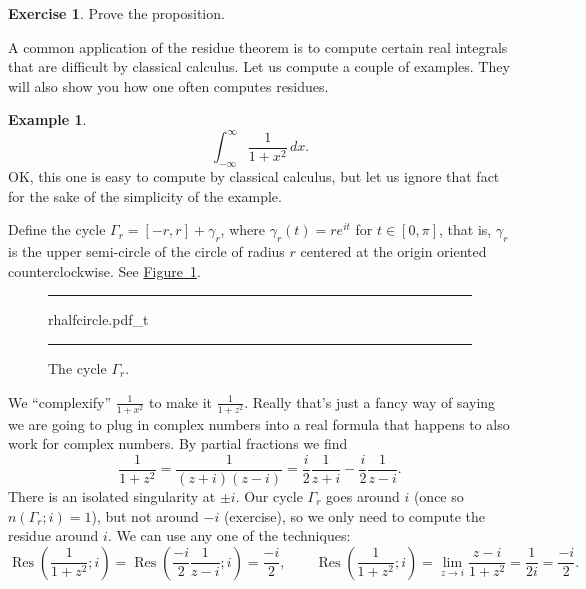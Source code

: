 \documentclass[12pt,openany]{book}
\theoremstyle{plain}
\theoremstyle{remark}
\theoremstyle{definition}
\newenvironment{exbox}{%
    \def\FrameCommand{\vrule width 1pt \relax\hspace {10pt}}%
    \MakeFramed {\advance \hsize -\width \FrameRestore }%
}{%
    \endMakeFramed
}
\newenvironment{myfig}{%
\begin{figure}[h!t]
\noindent\rule{\textwidth}{0.4pt}\vspace{12pt}\par\centering}%
{\par\noindent\rule{\textwidth}{0.4pt}
\end{figure}}
\theoremstyle{exercise}
\newtheorem{exercise}{Exercise}[section]
\theoremstyle{example}
\newtheorem{example}[thm]{Example}
\newcommand{\figureref}[1]{\hyperref[#1]{Figure~\ref*{#1}}}
\begin{document}
\begin{exbox}
\begin{exercise}
Prove the proposition.
\end{exercise}
\end{exbox}

A common application of the residue theorem is to compute certain real
integrals that are difficult by classical calculus.  Let us compute
a couple of examples.  They will also show you how one often computes
residues.

\begin{example}
\begin{equation*}
\int_{-\infty}^\infty \frac{1}{1+x^2} \, dx .
\end{equation*}
OK, this one is easy to compute by classical calculus, but let us ignore
that fact for the sake of the simplicity of the example.

Define the cycle $\Gamma_r = [-r,r] + \gamma_r$, where $\gamma_r(t) =
re^{it}$ for $t \in [0,\pi]$, that is, $\gamma_r$ is the upper semi-circle
of the circle of radius $r$ centered at the origin oriented counterclockwise.
See \figureref{fig:rhalfcircle}.

\begin{myfig}
{rhalfcircle.pdf_t}
\caption{The cycle $\Gamma_r$.\label{fig:rhalfcircle}}
\end{myfig}

We ``complexify''
$\frac{1}{1+x^2}$ to make it $\frac{1}{1+z^2}$.  Really
that's just a fancy way of saying we are going to plug in complex numbers
into a real formula that happens to also work for complex numbers.
By partial fractions we find
\begin{equation*}
\frac{1}{1+z^2} = \frac{1}{(z+i)(z-i)} =
\frac{i}{2} \frac{1}{z+i} - 
\frac{i}{2} \frac{1}{z-i} .
\end{equation*}
There is an isolated singularity at $\pm i$.  Our cycle
$\Gamma_r$ goes around $i$ (once so $n(\Gamma_r;i) = 1$),
but not around $-i$ (exercise), so we only need to compute
the residue around $i$.  We can use any one of the techniques:
\begin{equation*}
\operatorname{Res}\left(\frac{1}{1+z^2};i\right) =
\operatorname{Res}\left(
\frac{-i}{2} \frac{1}{z-i};
i\right) = \frac{-i}{2} ,
\qquad
\operatorname{Res}\left(\frac{1}{1+z^2};i\right) =
\lim_{z \to i} \frac{z-i}{1+z^2}
=
\frac{1}{2i} = \frac{-i}{2}.
\end{equation*}


\end{example}
\end{document}
